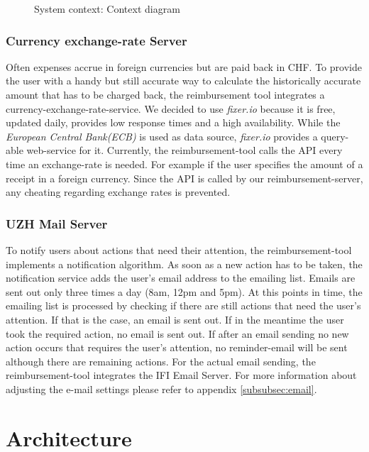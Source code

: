 \begin{figure}[H]
    \centering
    \caption{System context: Context diagram}
    \label{fig:context-diagram}
\end{figure}

\subsubsection{Currency exchange-rate Server}
Often expenses accrue in foreign currencies but are paid back in CHF. To provide the user with a handy but still accurate way to calculate the historically accurate amount that has to be charged back, the reimbursement tool integrates a currency-exchange-rate-service. We decided to use \textit{fixer.io} \cite{fixer} because it is free, updated daily, provides low response times and a high availability. While the \textit{European Central Bank(ECB)}\cite{ecb} is used as data source, \textit{fixer.io} provides a query-able web-service for it. Currently, the reimbursement-tool calls the API every time an exchange-rate is needed. For example if the user specifies the amount of a receipt in a foreign currency. Since the API is called by our reimbursement-server, any cheating regarding exchange rates is prevented.

\subsubsection{UZH Mail Server}
To notify users about actions that need their attention, the reimbursement-tool implements a notification algorithm. As soon as a new action has to be taken, the notification service adds the user's email address to the emailing list. Emails are sent out only three times a day (8am, 12pm and 5pm). At this points in time, the emailing list is processed by checking if there are still actions that need the user's attention. If that is the case, an email is sent out. If in the meantime the user took the required action, no email is sent out. If after an email sending no new action occurs that requires the user's attention, no reminder-email will be sent although there are remaining actions. For the actual email sending, the reimbursement-tool integrates the IFI Email Server. For more information about adjusting the e-mail settings please refer to appendix \ref{subsubsec:email}.

\newpage


\section{Architecture}

